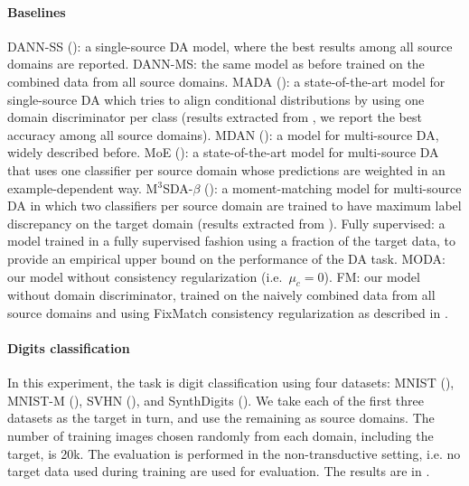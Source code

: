 \paragraph{Baselines} DANN-SS (\citet{Ganin2015}): a single-source DA model, where the best results among all source domains are reported. DANN-MS: the same model as before trained on the combined data from all source domains. MADA (\citet{Pei2018}): a state-of-the-art model for single-source DA which tries to align conditional distributions by using one domain discriminator per class (results extracted from \citet{Pei2018}, we report the best accuracy among all source domains). MDAN (\citet{Zhao2018}): a model for multi-source DA, widely described before. MoE (\citet{Guo2018}): a state-of-the-art model for multi-source DA that uses one classifier per source domain whose predictions are weighted in an example-dependent way. M$^3$SDA-$\beta$ (\citet{Peng2019}): a moment-matching model for multi-source DA in which two classifiers per source domain are trained to have maximum label discrepancy on the target domain (results extracted from \citet{Peng2019}). Fully supervised: a model trained in a fully supervised fashion using a fraction of the target data, to provide an empirical upper bound on the performance of the DA task. MODA: our model without consistency regularization (i.e.\ $\mu_c = 0$). FM: our model without domain discriminator, trained on the naively combined data from all source domains and using FixMatch consistency regularization as described in .

\paragraph{Digits classification} In this experiment, the task is digit classification using four datasets: MNIST (\citet{LeCun1998}), MNIST-M (\citet{Ganin2015}), SVHN (\citet{Netzer2011}), and SynthDigits (\citet{Ganin2015}). We take each of the first three datasets as the target in turn, and use the remaining as source domains. The number of training images chosen randomly from each domain, including the target, is 20k. The evaluation is performed in the non-transductive setting, i.e. no target data used during training are used for evaluation. The results are in .

